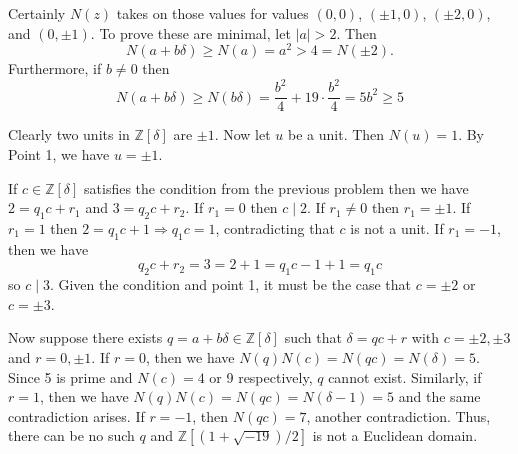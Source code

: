 \documentclass[../../master.tex]{subfiles}
\begin{document}
    \begin{solution}
        Certainly $N(z)$ takes on those values for values $(0, 0)$, $(\pm1, 0)$,
        $(\pm2, 0)$, and $(0, \pm1)$. To prove these are minimal, let $|a| > 2$.
        Then
        \[
             N(a + b \delta) \geq N(a) = a^2 > 4 = N(\pm2).
        \]    
        Furthermore, if $b \neq 0$ then 
        \[
            N(a + b \delta) \geq N(b \delta) = \frac{b^2}{4} + 19 \cdot
            \frac{b^2}{4} = 5 b^2 \geq 5
        \] 

        Clearly two units in $\mathbb{Z}[\delta]$ are $\pm 1$. Now let $u$ be a
        unit. Then $N(u) = 1$. By Point 1, we have $u = \pm 1$.

        If $c \in \mathbb{Z}[\delta]$ satisfies the condition from the previous
        problem then we have $2 = q_1c + r_1$ and $3 = q_2c + r_2$. If $r_1 =
        0$ then $c \mid 2$. If $r_1 \neq 0$ then $r_1 = \pm 1$. If $r_1 = 1$
        then $2 = q_1c + 1 \Longrightarrow q_1c = 1$, contradicting that $c$ is
        not a unit. If $r_1 = -1$, then we have
        \[
        q_2c + r_2 = 3 = 2 + 1 = q_1c - 1 + 1 = q_1c
        \] 
        so $c \mid 3$. Given the condition and point 1, it must be the case that
        $c = \pm 2$ or $c = \pm 3$.

        Now suppose there exists $q = a + b\delta \in \mathbb{Z}[\delta]$ such
        that $\delta = qc + r$ with $c = \pm 2, \pm 3$ and $r = 0, \pm 1$. If $r
        = 0$, then we have $N(q) N(c) = N(qc) = N(\delta) = 5$. Since 5 is
        prime and $N(c) = 4$ or 9 respectively, $q$ cannot exist. Similarly, if
        $r = 1$, then we have $N(q) N(c) = N(qc) = N(\delta - 1) = 5$ and the
        same contradiction arises. If $r = -1$, then $N(qc) = 7$, another
        contradiction. Thus, there can be no such $q$ and $\mathbb{Z}[(1 +
        \sqrt{-19}) / 2]$ is not a Euclidean domain.
    \end{solution}
\end{document}
